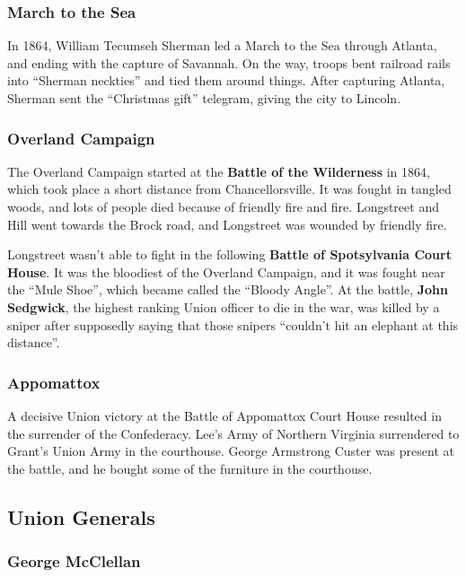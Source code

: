 \subsubsection*{March to the Sea}

In 1864, William Tecumseh Sherman led a March to the Sea through Atlanta, and ending with the capture of Savannah.
On the way, troops bent railroad rails into ``Sherman neckties'' and tied them around things.
After capturing Atlanta, Sherman sent the ``Christmas gift'' telegram, giving the city to Lincoln.

\subsubsection*{Overland Campaign}

The Overland Campaign started at the \textbf{Battle of the Wilderness} in 1864,
which took place a short distance from Chancellorsville.
It was fought in tangled woods, and lots of people died because of friendly fire and fire.
Longstreet and Hill went towards the Brock road, and Longstreet was wounded by friendly fire.

Longstreet wasn't able to fight in the following \textbf{Battle of Spotsylvania Court House}.
It was the bloodiest of the Overland Campaign, and it was fought near the ``Mule Shoe'',
which became called the ``Bloody Angle''.
At the battle, \textbf{John Sedgwick}, the highest ranking Union officer to die in the war,
was killed by a sniper after supposedly saying that those snipers ``couldn't hit an elephant at this distance''.

\subsubsection*{Appomattox}

A decisive Union victory at the Battle of Appomattox Court House resulted in the surrender of the Confederacy.
Lee's Army of Northern Virginia surrendered to Grant's Union Army in the courthouse.
George Armstrong Custer was present at the battle, and he bought some of the furniture in the courthouse.

\subsection*{Union Generals}

\subsubsection*{George McClellan}

